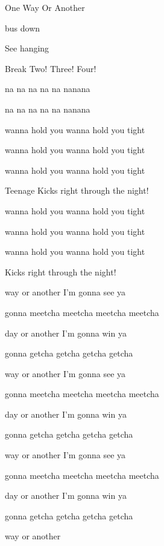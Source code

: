\begin{SBSong}{One Way Or Another}
\begin{SBVerse}
       bus down

    See  hanging  
  \end{SBVerse}
  \begin{SBBracket}{Break}
     Two! Three! Four!

     na na na na na nanana

     na na na na na nanana

     wanna hold you wanna hold you tight

     wanna hold you wanna hold you tight

     wanna hold you wanna hold you tight

     Teenage Kicks right through the night!

     wanna hold you wanna hold you tight

     wanna hold you wanna hold you tight

     wanna hold you wanna hold you tight

      Kicks right through the night!
  \end{SBBracket}
  \begin{SBChorus}
     way or another I'm gonna see ya

     gonna meetcha meetcha meetcha meetcha

     day or another I'm gonna win ya

     gonna getcha getcha getcha getcha

     way or another I'm gonna see ya

     gonna meetcha meetcha meetcha meetcha 

     day or another I'm gonna win ya

     gonna getcha getcha getcha getcha

     way or another I'm gonna see ya

     gonna meetcha meetcha meetcha meetcha

     day or another I'm gonna win ya

     gonna getcha getcha getcha getcha

     way or another
  \end{SBChorus}
\end{SBSong}